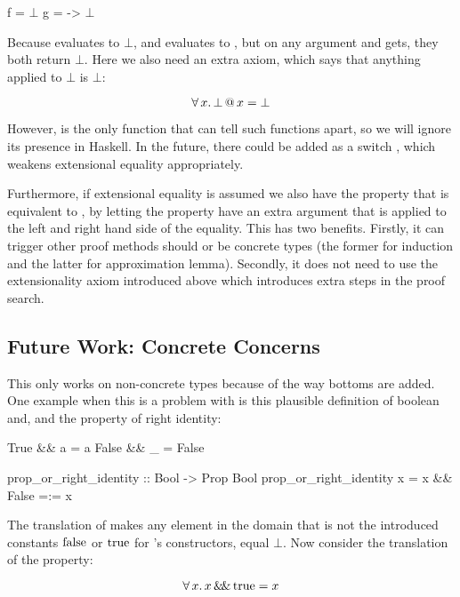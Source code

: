 \begin{code}[mathescape]
f = $\bot$
g = \x -> $\bot$
\end{code}

Because  evaluates to $\bot$, and  evaluates
to \hs{()}, but on any argument  and  gets, they both
return $\bot$. Here we also need an extra axiom, which says that
anything applied to $\bot$ is $\bot$:

\begin{equation*}
\forall \, x . \, \bot \, @ \, x = \bot
\end{equation*}

However,  is the only function that can tell such functions
apart, so we will ignore its presence in Haskell.  In the future,
there could be added as a switch , which weakens
extensional equality appropriately.

Furthermore, if extensional equality is assumed we also have the
property that  is equivalent to , by
letting the property have an extra argument that is applied to the
left and right hand side of the equality. This has two
benefits. Firstly, it can trigger other proof methods should  or
 be concrete types (the former for induction and the latter for
approximation lemma). Secondly, it does not need to use the
extensionality axiom introduced above which introduces extra steps in
the proof search.

\subsection{Future Work: Concrete Concerns}
\label{sec:concreteconcerns}

This only works on non-concrete types because of the way bottoms are
added. One example when this is a problem with is this plausible
definition of boolean and, and the property of right identity:

\begin{code}
True  && a = a
False && _ = False

prop_or_right_identity :: Bool -> Prop Bool
prop_or_right_identity x = x && False =:= x
\end{code}

The translation of \hs{&&} makes any element in the domain that is not
the introduced constants $\mathrm{false}$ or $\mathrm{true}$ for 's
constructors, equal $\bot$. Now consider the translation of the
property:

\begin{equation*}
\forall \, x . \, x \, \mathrm{\&\!\&} \, \mathrm{true} = x
\end{equation*}

